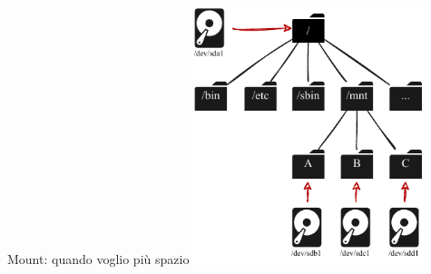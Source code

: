 \documentclass{beamer}
\begin{document}
    \begin{frame}{Mount: quando voglio più spazio}
        \centering
        \includegraphics[height=7.5cm, keepaspectratio]{images/mountpoint.pdf}
    \end{frame}
\end{document}
